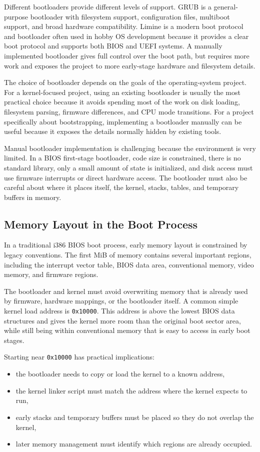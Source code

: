 Different bootloaders provide different levels of support. GRUB is a general-purpose bootloader with filesystem support, configuration files, multiboot support, and broad hardware compatibility. Limine is a modern boot protocol and bootloader often used in hobby OS development because it provides a clear boot protocol and supports both BIOS and UEFI systems. A manually implemented bootloader gives full control over the boot path, but requires more work and exposes the project to more early-stage hardware and filesystem details.

The choice of bootloader depends on the goals of the operating-system project. For a kernel-focused project, using an existing bootloader is usually the most practical choice because it avoids spending most of the work on disk loading, filesystem parsing, firmware differences, and CPU mode transitions. For a project specifically about bootstrapping, implementing a bootloader manually can be useful because it exposes the details normally hidden by existing tools.

Manual bootloader implementation is challenging because the environment is very limited. In a BIOS first-stage bootloader, code size is constrained, there is no standard library, only a small amount of state is initialized, and disk access must use firmware interrupts or direct hardware access. The bootloader must also be careful about where it places itself, the kernel, stacks, tables, and temporary buffers in memory.

\subsection{Memory Layout in the Boot Process}
In a traditional i386 BIOS boot process, early memory layout is constrained by legacy conventions. The first MiB of memory contains several important regions, including the interrupt vector table, BIOS data area, conventional memory, video memory, and firmware regions.

The bootloader and kernel must avoid overwriting memory that is already used by firmware, hardware mappings, or the bootloader itself. A common simple kernel load address is \texttt{0x10000}. This address is above the lowest BIOS data structures and gives the kernel more room than the original boot sector area, while still being within conventional memory that is easy to access in early boot stages.

Starting near \texttt{0x10000} has practical implications:
\begin{itemize}
  \item the bootloader needs to copy or load the kernel to a known address,
  \item the kernel linker script must match the address where the kernel expects to run,
  \item early stacks and temporary buffers must be placed so they do not overlap the kernel,
  \item later memory management must identify which regions are already occupied.
\end{itemize}

